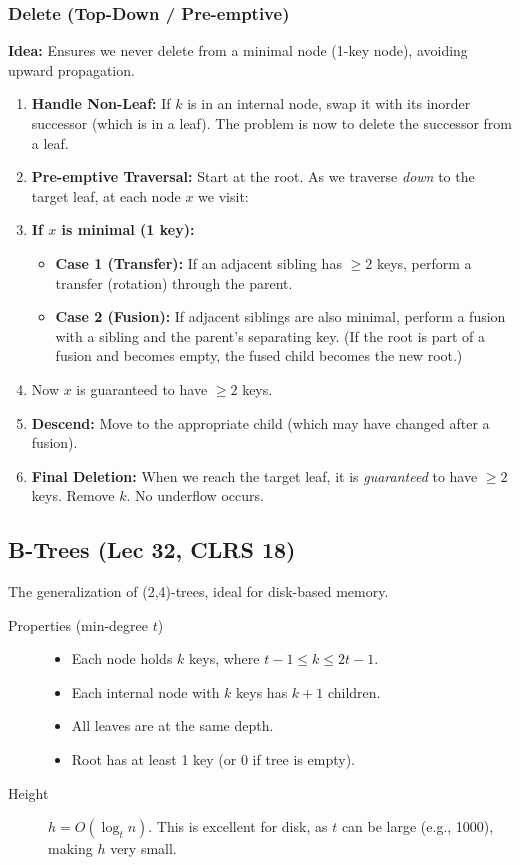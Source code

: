 \subsubsection{Delete (Top-Down / Pre-emptive)}
\textbf{Idea:} Ensures we never delete from a minimal node (1-key node), avoiding upward propagation.
\begin{enumerate}
    \item \textbf{Handle Non-Leaf:} If $k$ is in an internal node, swap it with its inorder successor (which is in a leaf). The problem is now to delete the successor from a leaf.
    \item \textbf{Pre-emptive Traversal:} Start at the root. As we traverse \textit{down} to the target leaf, at each node $x$ we visit:
    \item \textbf{If $x$ is minimal (1 key):}
    \begin{itemize}
        \item \textbf{Case 1 (Transfer):} If an adjacent sibling has $\ge 2$ keys, perform a transfer (rotation) through the parent.
        \item \textbf{Case 2 (Fusion):} If adjacent siblings are also minimal, perform a fusion with a sibling and the parent's separating key. (If the root is part of a fusion and becomes empty, the fused child becomes the new root.)
    \end{itemize}
    \item Now $x$ is guaranteed to have $\ge 2$ keys.
    \item \textbf{Descend:} Move to the appropriate child (which may have changed after a fusion).
    \item \textbf{Final Deletion:} When we reach the target leaf, it is \textit{guaranteed} to have $\ge 2$ keys. Remove $k$. No underflow occurs.
\end{enumerate}


\subsection{B-Trees (Lec 32, CLRS 18)}
The generalization of (2,4)-trees, ideal for disk-based memory.
\begin{description}
    \item[Properties (min-degree $t$)]
    \begin{itemize}
        \item Each node holds $k$ keys, where $t-1 \le k \le 2t-1$.
        \item Each internal node with $k$ keys has $k+1$ children.
        \item All leaves are at the same depth.
        \item Root has at least 1 key (or 0 if tree is empty).
    \end{itemize}
    \item[Height] $h = O(\log_t n)$. This is excellent for disk, as $t$ can be large (e.g., 1000), making $h$ very small.
\end{description}

